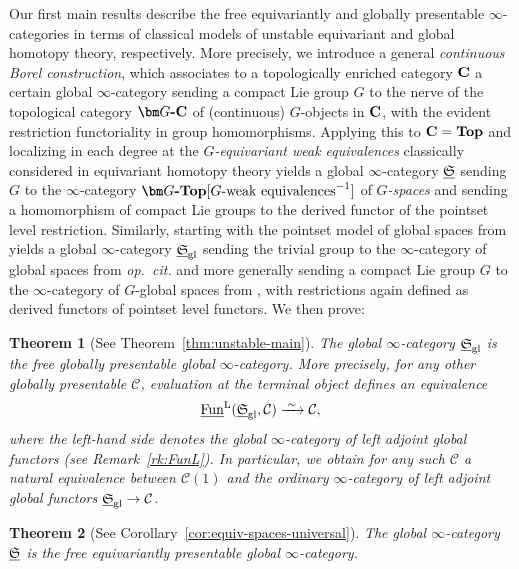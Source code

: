\documentclass[reqno]{memo-l}
\theoremstyle{mythm}
\newtheorem{introthm}{Theorem}
\theoremstyle{definition}
\numberwithin{equation}{section}
\newcommand{\Cc}{{\mathcal{C}}}
\newcommand{\gl}{\textup{gl}}
\newcommand{\Fun}{{\textup{Fun}}}
\newcommand{\cat}[1]{\textbf{\textup{#1}}}
\newcommand{\ulhelper}[2]{\underline{\setbox0=\hbox{$#1#2$}\dp0=0.4pt \box0\relax}}
\newcommand{\ul}[1]{{\mathpalette\ulhelper{#1}}\hbox{\rule[-2pt]{0pt}{0pt}}}
\newcommand{\iso}{\xrightarrow{\;\smash{\raisebox{-0.25ex}{\ensuremath{\scriptstyle\sim}}}\;}}
\newcommand{\myS}{{{\mathfrak S\kern-.4pt}}}
\begin{document}
Our first main results describe the free equivariantly and globally presentable $\infty$-categories in terms of classical models of unstable equivariant and global homotopy theory, respectively. More precisely, we introduce a general \emph{continuous Borel construction}, which associates to a topologically enriched category $\cat{C}$ a certain global $\infty$-category sending a compact Lie group $G$ to the nerve of the topological category $\cat{$\bm G$-$\cat{C}$}$ of (continuous) $G$-objects in $\cat{C}$, with the evident restriction functoriality in group homomorphisms. Applying this to $\cat{C}=\cat{Top}$ and localizing in each degree at the \emph{$G$-equivariant weak equivalences} classically considered in equivariant homotopy theory yields a global $\infty$-category $\ul\myS$ sending $G$ to the $\infty$-category $\cat{$\bm G$-Top}[\text{$G$-weak equivalences}^{-1}]$ of \hbox{\emph{$G$-spaces}} and sending a homomorphism of compact Lie groups to the derived functor of the pointset level restriction. Similarly, starting with the pointset model of global spaces from \cite{schwede2018global} yields a global $\infty$-category $\ul\myS_\gl$ sending the trivial group to the $\infty$-category of global spaces from \emph{op.\ cit.} and more generally sending a compact Lie group $G$ to the $\infty$-category of $G$-global spaces from \cite{barrero2021}, with restrictions again defined as derived functors of pointset level functors. We then prove:

\begin{introthm}[See Theorem~\ref{thm:unstable-main}]\label{introthm:unstable-main}
    The global $\infty$-category $\ul\myS_\gl$ is the free globally presentable global $\infty$-category. More precisely, for any other globally presentable $\Cc$, evaluation at the terminal object defines an equivalence
    \[
        \ul\Fun^\textup{L}(\ul\myS_\gl,\Cc)\iso\Cc,
    \]
    where the left-hand side denotes the global $\infty$-category of left adjoint global functors (see Remark~\ref{rk:FunL}). In particular, we obtain for any such $\Cc$ a natural equivalence between $\Cc(1)$ and the ordinary $\infty$-category of left adjoint global functors $\ul\myS_\gl\to\Cc$.
\end{introthm}

\begin{introthm}[See Corollary~\ref{cor:equiv-spaces-universal}]\label{introthm:unstable-equiv}
    The global $\infty$-category $\ul\myS$ is the free equivariantly presentable global $\infty$-category.
\end{introthm}
\end{document}
